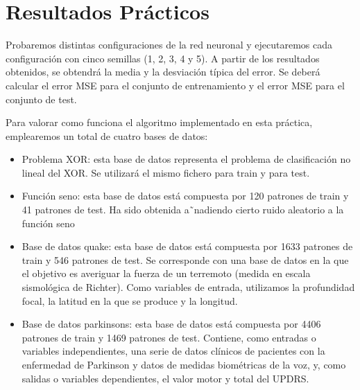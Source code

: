 \section{Resultados Prácticos}
Probaremos distintas configuraciones de la red neuronal y ejecutaremos cada configuración con cinco semillas (1, 2, 3, 4 y 5). A partir de los resultados obtenidos, se obtendrá la media y la desviación típica del error. Se deberá calcular el error MSE para el conjunto de entrenamiento y el error MSE para el conjunto de test.

Para valorar como funciona el algoritmo implementado en esta práctica, emplearemos un total de cuatro bases de datos:
\begin{itemize}
\item Problema XOR: esta base de datos representa el problema de clasificación no lineal del XOR. Se utilizará el mismo fichero para train y para test.
\item Función seno: esta base de datos está compuesta por 120 patrones de train y 41 patrones de test. Ha sido obtenida a˜nadiendo cierto ruido aleatorio a la función seno
\item Base de datos quake: esta base de datos está compuesta por 1633 patrones de train y 546 patrones de test. Se corresponde con una base de datos en la que el objetivo es averiguar la fuerza de un terremoto (medida en escala sismológica de Richter). Como variables de entrada, utilizamos la profundidad focal, la latitud en la que se produce y la longitud.
\item Base de datos parkinsons: esta base de datos está compuesta por 4406 patrones de train y 1469 patrones de test. Contiene, como entradas o variables independientes, una serie de datos clínicos de pacientes con la enfermedad de Parkinson y datos de medidas biométricas de la voz, y, como salidas o variables dependientes, el valor motor y total del UPDRS.
\end{itemize}

